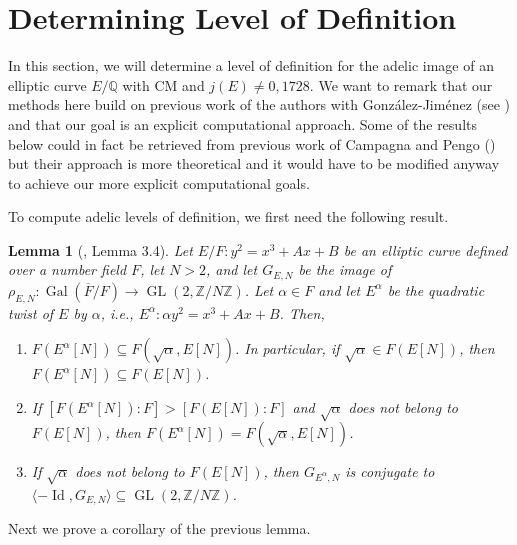 \documentclass[11pt]{amsart}
\newtheorem{lemma}[defn]{Lemma}
\theoremstyle{definition}
\newcommand{\Q}{\mathbb{Q}}
\newcommand{\Z}{\mathbb{Z}}
\newcommand{\Gal}{\operatorname{Gal}}
\newcommand{\GL}{\operatorname{GL}}
\begin{document}
\section{Determining Level of Definition}\label{sec-determinelevelofdef}

In this section, we will determine a level of definition for the adelic image of an elliptic curve $E/\Q$ with CM and $j(E) \neq 0, 1728$. We want to remark that our methods here build on previous work of the authors with Gonz\'alez-Jim\'enez (see \cite{modelspaper}) and that our goal is an explicit computational approach. Some of the results below could  in fact be retrieved from previous work of Campagna and Pengo (\cite{CampagnaPengo1}) but their approach is more theoretical and it would have to be modified anyway to achieve our more explicit computational goals.


To compute adelic levels of definition, we first need the following result. 


\begin{lemma}[\cite{modelspaper}, Lemma 3.4]\label{modelspaper-twistlemma}\label{lem-twistimage}
    Let $E/F : y^2=x^3+Ax+B$ be an elliptic curve defined over a number field $F$, let $N>2$, and let $G_{E,N}$ be the image of $\rho_{E,N}\colon \Gal(\overline{F}/F)\to \GL(2,\Z/N\Z)$. Let $\alpha \in F$ and let $E^\alpha$ be the quadratic twist of $E$ by $\alpha$, i.e., $E^\alpha : \alpha y^2 = x^3+Ax+B$. Then, 
    \begin{enumerate}
        \item $F(E^\alpha[N])\subseteq F(\sqrt{\alpha},E[N])$. In particular, if $\sqrt{\alpha}\in F(E[N])$, then $F(E^\alpha[N])\subseteq F(E[N])$.
        \item If $[F(E^\alpha[N]):F] > [F(E[N]):F]$ and $\sqrt{\alpha}$ does not belong to $F(E[N])$, then $F(E^\alpha[N])=F(\sqrt{\alpha},E[N])$.
        \item If $\sqrt{\alpha}$ does not belong to $F(E[N])$, then $G_{E^\alpha,N}$ is conjugate to $\langle -\operatorname{Id},G_{E,N}\rangle \subseteq \GL(2,\Z/N\Z)$.
    \end{enumerate}
\end{lemma}

Next we prove a corollary of the previous lemma.
\end{document}

